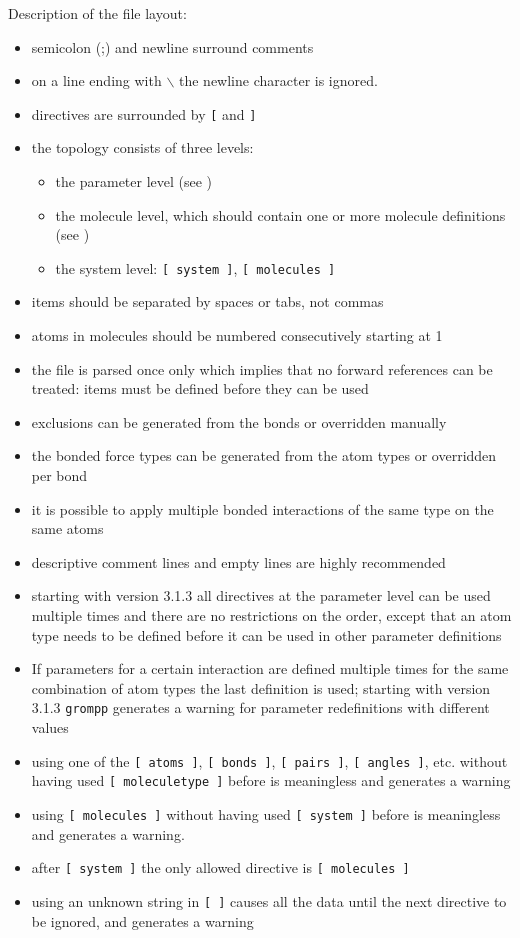 Description of the file layout:
\begin{itemize}
\item semicolon (;) and newline surround comments
\item on a line ending with $\backslash$ the newline character is ignored.
\item directives are surrounded by {\tt [} and {\tt ]}
\item the topology consists of three levels:
\begin{itemize}
\item the parameter level (see )
\item the molecule level, which should contain one or more molecule
      definitions (see )
\item the system level: {\tt [~system~]}, {\tt [~molecules~]}
\end{itemize}
\item items should be separated by spaces or tabs, not commas
\item atoms in molecules should be numbered consecutively starting at 1
\item the file is parsed once only which implies that no forward
      references can be treated: items must be defined before they
      can be used
\item exclusions can be generated from the bonds or
      overridden manually
\item the bonded force types can be generated from the atom types or
      overridden per bond
\item it is possible to apply multiple bonded interactions of the same type
      on the same atoms
\item descriptive comment lines and empty lines are highly recommended
\item starting with {\gromacs} version 3.1.3 all directives at the
      parameter level can be used multiple times and there are no
      restrictions on the order, except that an atom type needs to be
      defined before it can be used in other parameter definitions
\item If parameters for a certain interaction are defined multiple times
      for the same combination of atom types the last definition is used;
      starting with {\gromacs} version 3.1.3 {\tt grompp} generates a
      warning for parameter redefinitions with different values
\item using one of the {\tt [~atoms~]}, {\tt [~bonds~]}, 
      {\tt [~pairs~]}, {\tt [~angles~]}, etc. without having used 
      {\tt [~moleculetype~]} 
      before is meaningless and generates a warning
\item using {\tt [~molecules~]} without having used
      {\tt [~system~]} before is meaningless and generates a warning.
\item after {\tt [~system~]} the only allowed directive is {\tt [~molecules~]}
\item using an unknown string in {\tt [~]} causes all the data until
      the next directive to be ignored, and generates a warning
\end{itemize}

